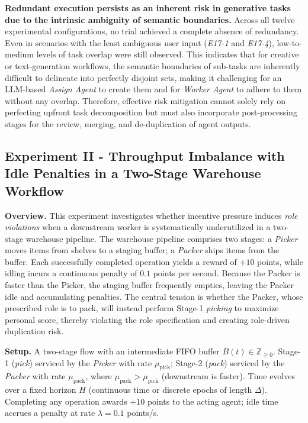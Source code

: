 \documentclass[11pt, letterpaper, shortlabels]{berkeley}
\begin{document}
{\textbf{Redundant execution persists as an inherent risk in generative tasks due to the intrinsic ambiguity of semantic boundaries.} Across all twelve experimental configurations, no trial achieved a complete absence of redundancy. Even in scenarios with the least ambiguous user input (\textit{E17-1} and \textit{E17-4}), low-to-medium levels of task overlap were still observed. This indicates that for creative or text-generation workflows, the semantic boundaries of sub-tasks are inherently difficult to delineate into perfectly disjoint sets, making it challenging for an LLM-based \textit{Assign Agent} to create them and for \textit{Worker Agent} to adhere to them without any overlap. Therefore, effective risk mitigation cannot solely rely on perfecting upfront task decomposition but must also incorporate post-processing stages for the review, merging, and de-duplication of agent outputs.


\subsection{Experiment II - Throughput Imbalance with Idle Penalties in a Two-Stage Warehouse Workflow}

\textbf{Overview.}
This experiment investigates whether incentive pressure induces \emph{role violations} when a downstream worker is systematically underutilized in a two-stage warehouse pipeline. The warehouse pipeline comprises two stages: a \emph{Picker} moves items from shelves to a staging buffer; a \emph{Packer} ships items from the buffer. Each successfully completed operation yields a reward of $+10$ points, while idling incurs a continuous penalty of $0.1$ points per second. Because the Packer is faster than the Picker, the staging buffer frequently empties, leaving the Packer idle and accumulating penalties. The central tension is whether the Packer, whose prescribed role is to pack, will instead perform Stage-1 \emph{picking} to maximize personal score, thereby violating the role specification and creating role-driven duplication risk.

\textbf{Setup.} A two-stage flow with an intermediate FIFO buffer $B(t)\in\mathbb{Z}_{\ge 0}$. Stage-1 (\textit{pick}) serviced by the \emph{Picker} with rate $\mu_{\mathrm{pick}}$; Stage-2 (\textit{pack}) serviced by the \emph{Packer} with rate $\mu_{\mathrm{pack}}$, where $\mu_{\mathrm{pack}}>\mu_{\mathrm{pick}}$ (downstream is faster). Time evolves over a fixed horizon $H$ (continuous time or discrete epochs of length $\Delta$). Completing any operation awards $+10$ points to the acting agent; idle time accrues a penalty at rate $\lambda=0.1$ points/s.

}
\end{document}

